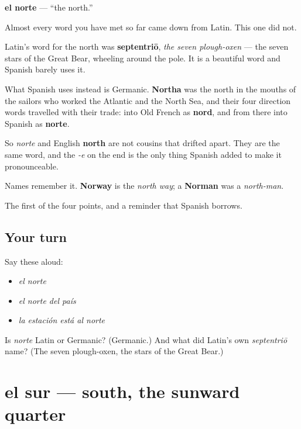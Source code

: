 \begin{cousinweb}
\textbf{el norte} — \textquotedblleft{}the north.\textquotedblright{}

Almost every word you have met so far came down from Latin. This one did not.

Latin's word for the north was \textbf{septentriō}, \emph{the seven plough-oxen} — the seven stars of the Great Bear, wheeling around the pole. It is a beautiful word and Spanish barely uses it.

What Spanish uses instead is Germanic. \textbf{Northa} was the north in the mouths of the sailors who worked the Atlantic and the North Sea, and their four direction words travelled with their trade: into Old French as \textbf{nord}, and from there into Spanish as \textbf{norte}.

So \emph{norte} and English \textbf{north} are not cousins that drifted apart. They are the same word, and the \emph{-e} on the end is the only thing Spanish added to make it pronounceable.

Names remember it. \textbf{Norway} is the \emph{north way}; a \textbf{Norman} was a \emph{north-man}.
\end{cousinweb}

\begin{grammarlens}[title={What you've built}]
The first of the four points, and a reminder that Spanish borrows.
\end{grammarlens}

\subsection*{Your turn}
Say these aloud:

\begin{itemize}
\raggedright
  \item \emph{el norte}
  \item \emph{el norte del país}
  \item \emph{la estación está al norte}
\end{itemize}

\begin{tcolorbox}[breakable,colback=teal!4,colframe=teal!35!black,title={Before you move on}]
Is \emph{norte} Latin or Germanic? (Germanic.) And what did Latin's own \emph{septentriō} name? (The seven plough-oxen, the stars of the Great Bear.)
\end{tcolorbox}
\section[el sur]{el sur — south, the sunward quarter}

